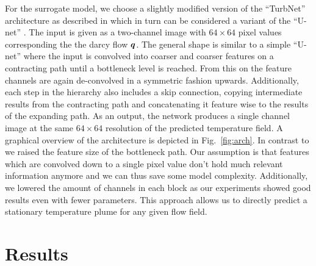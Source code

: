 \documentclass{article} %
\begin{document}
For the surrogate model, we choose a slightly modified version of the ``TurbNet'' architecture as described in \citet{Thuerey2019} which in turn can be considered a variant of the ``U-net'' \citep{Ronneberger2015}.
The input is given as a two-channel image with $64\times64$ pixel values corresponding the the darcy flow ${\bm{q}}$.
The general shape is similar to a simple ``U-net'' where the input is convolved into coarser and coarser features on a contracting path until a bottleneck level is reached. 
From this on the feature channels are again de-convolved in a symmetric fashion upwards.
Additionally, each step in the hierarchy also includes a skip connection, copying intermediate results from the contracting path and concatenating it feature wise to the results of the expanding path.
As an output, the network produces a single channel image at the same $64\times64$ resolution of the predicted temperature field.
A graphical overview of the architecture is depicted in Fig.~\ref{fig:arch}.
In contrast to \citep{Thuerey2019} we raised the feature size of the bottleneck path.
Our assumption is that features which are convolved down to a single pixel value don't hold much relevant information anymore and we can thus save some model complexity.
Additionally, we lowered the amount of channels in each block as our experiments showed good results even with fewer parameters.
This approach allows us to directly predict a stationary temperature plume for any given flow field.



\section{Results}
\label{sec:results}

\end{document}
